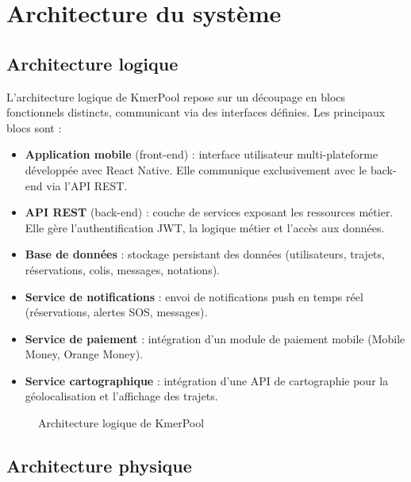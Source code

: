 \documentclass[12pt, a4paper]{report}
\begin{document}
\section{Architecture du système}

\subsection{Architecture logique}

L'architecture logique de KmerPool repose sur un découpage en blocs fonctionnels
distincts, communicant via des interfaces définies. Les principaux blocs sont :

\begin{itemize}
  \item \textbf{Application mobile} (front-end) : interface utilisateur multi-plateforme
        développée avec React Native. Elle communique exclusivement avec le back-end
        via l'\ac{API} \ac{REST}.
  \item \textbf{\ac{API} \ac{REST}} (back-end) : couche de services exposant les
        ressources métier. Elle gère l'authentification \ac{JWT}, la logique métier
        et l'accès aux données.
  \item \textbf{Base de données} : stockage persistant des données (utilisateurs,
        trajets, réservations, colis, messages, notations).
  \item \textbf{Service de notifications} : envoi de notifications push en temps réel
        (réservations, alertes SOS, messages).
  \item \textbf{Service de paiement} : intégration d'un module de paiement mobile
        (Mobile Money, Orange Money).
  \item \textbf{Service cartographique} : intégration d'une \ac{API} de cartographie
        pour la géolocalisation et l'affichage des trajets.
\end{itemize}

\begin{figure}[H]
  \centering
  \caption{Architecture logique de KmerPool}
  \label{fig:archi_logique}
\end{figure}

\subsection{Architecture physique}
\end{document}
